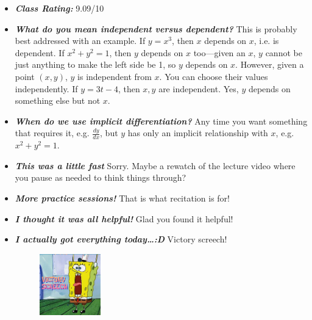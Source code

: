 \documentclass[11pt,letterpaper]{article}
\begin{document}
\begin{itemize}
\item {\bfseries\itshape Class Rating:} 9.09/10

\item {\bfseries\itshape  What do you mean independent versus dependent?} This is probably best addressed with an example. If $y= x^3$, then $x$ depends on $x$, i.e. is dependent. If $x^2 + y^2= 1$, then $y$ depends on $x$ too---given an $x$, $y$ cannot be just anything to make the left side be 1, so $y$ depends on $x$. However, given a point $(x, y)$, $y$ is independent from $x$. You can choose their values independently. If $y= 3t - 4$, then $x, y$ are independent. Yes, $y$ depends on something else but not $x$. 

\item {\bfseries\itshape When do we use implicit differentiation?} Any time you want something that requires it, e.g. $\frac{dy}{dx}$, but $y$ has only an implicit relationship with $x$, e.g. $x^2 + y^2= 1$. 

\item {\bfseries\itshape This was a little fast} Sorry. Maybe a rewatch of the lecture video where you pause as needed to think things through?

\item {\bfseries\itshape More practice sessions!} That is what recitation is for!

\item {\bfseries\itshape I thought it was all helpful!} Glad you found it helpful!

\item {\bfseries\itshape I actually got everything today\dots :D} Victory screech!
	\begin{figure}[H]
	\centering
	\includegraphics[width=0.25\textwidth]{images/screech.jpeg}
	\end{figure}


\end{itemize}
\end{document}
